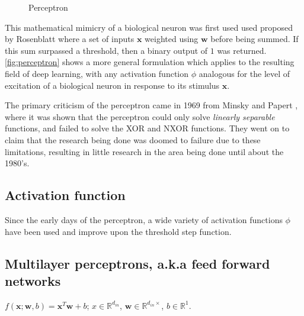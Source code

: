 \begin{figure}[htbp]
    \centering
    
    \caption{Perceptron}
    \label{fig:perceptron}
\end{figure}

This mathematical mimicry of a biological neuron was first used used proposed by
Rosenblatt where a set of inputs $\mathbf{x}$ weighted using $\mathbf{w}$ before
being summed. If this sum surpassed a threshold, then a binary output of $1$ was
returned. \autoref{fig:perceptron} shows a more general formulation which
applies to the resulting field of deep learning, with any activation function
$\phi$ analogous for the level of excitation of a biological neuron in response
to its stimulus $\mathbf{x}$.

The primary criticism of the perceptron came in 1969 from Minsky and Papert
\cite{minsky69perceptrons}, where it was shown that the perceptron could only
solve \textit{linearly separable} functions, and failed to solve the XOR and
NXOR functions. They went on to claim that the research being done was doomed to
failure due to these limitations, resulting in little research in the area being
done until about the 1980's.

\subsection{Activation function}

Since the early days of the perceptron, a wide variety of activation functions
$\phi$ have been used and improve upon the threshold step function.

%    


\subsection{Multilayer perceptrons, a.k.a feed forward networks}

$f(\mathbf{x};\mathbf{w}, b)=\mathbf{x}^T\mathbf{w}+b$; $x\in\mathbb{R}^{d_{in}}$, $\mathbf{w}\in\mathbb{R}^{d_{in}\times}$, $b\in\mathbb{R}^1$.

